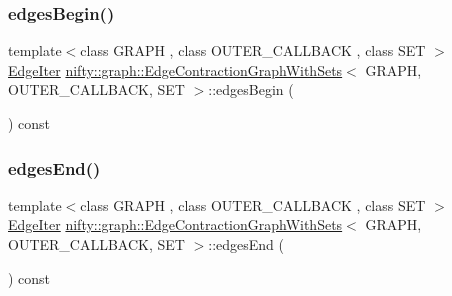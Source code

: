 \mbox{\label{classnifty_1_1graph_1_1EdgeContractionGraphWithSets_acb3a7779de4afce4977b4cd9f2a91ccc}} 
\subsubsection{\texorpdfstring{edges\+Begin()}{edgesBegin()}}
{\footnotesize\ttfamily template$<$class G\+R\+A\+PH , class O\+U\+T\+E\+R\+\_\+\+C\+A\+L\+L\+B\+A\+CK , class S\+ET $>$ \\
\hyperlink{classnifty_1_1graph_1_1EdgeContractionGraphWithSets_abfc56b6e721306de50e308e7b199b18c}{Edge\+Iter} \hyperlink{classnifty_1_1graph_1_1EdgeContractionGraphWithSets}{nifty\+::graph\+::\+Edge\+Contraction\+Graph\+With\+Sets}$<$ G\+R\+A\+PH, O\+U\+T\+E\+R\+\_\+\+C\+A\+L\+L\+B\+A\+CK, S\+ET $>$\+::edges\+Begin (\begin{DoxyParamCaption}{ }\end{DoxyParamCaption}) const\hspace{0.3cm}{\ttfamily [inline]}}

\mbox{\label{classnifty_1_1graph_1_1EdgeContractionGraphWithSets_aca281d65d5cf3d75727cf9f21745bad6}} 
\subsubsection{\texorpdfstring{edges\+End()}{edgesEnd()}}
{\footnotesize\ttfamily template$<$class G\+R\+A\+PH , class O\+U\+T\+E\+R\+\_\+\+C\+A\+L\+L\+B\+A\+CK , class S\+ET $>$ \\
\hyperlink{classnifty_1_1graph_1_1EdgeContractionGraphWithSets_abfc56b6e721306de50e308e7b199b18c}{Edge\+Iter} \hyperlink{classnifty_1_1graph_1_1EdgeContractionGraphWithSets}{nifty\+::graph\+::\+Edge\+Contraction\+Graph\+With\+Sets}$<$ G\+R\+A\+PH, O\+U\+T\+E\+R\+\_\+\+C\+A\+L\+L\+B\+A\+CK, S\+ET $>$\+::edges\+End (\begin{DoxyParamCaption}{ }\end{DoxyParamCaption}) const\hspace{0.3cm}{\ttfamily [inline]}}

